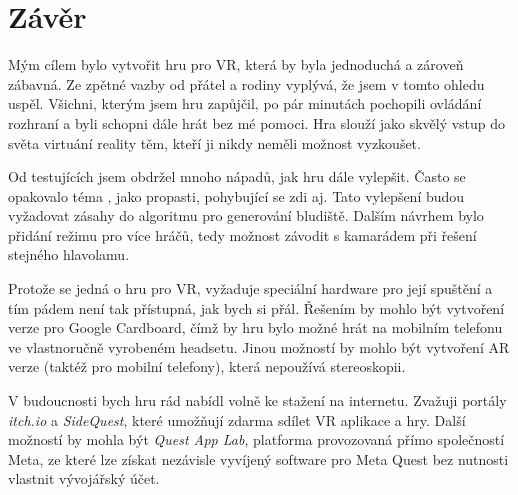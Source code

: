 \chapter*{Závěr}

Mým cílem bylo vytvořit hru pro VR, která by byla jednoduchá a zároveň zábavná. Ze zpětné vazby od přátel a rodiny vyplývá, že jsem v tomto ohledu uspěl. Všichni, kterým jsem hru zapůjčil, po pár minutách pochopili ovládání rozhraní a byli schopni dále hrát bez mé pomoci. Hra slouží jako skvělý vstup do světa virtuání reality těm, kteří ji nikdy neměli možnost vyzkoušet.

Od testujících jsem obdržel mnoho nápadů, jak hru dále vylepšit. Často se opakovalo téma , jako propasti, pohybující se zdi aj. Tato vylepšení budou vyžadovat zásahy do algoritmu pro generování bludiště. Dalším návrhem bylo přidání režimu pro více hráčů, tedy možnost závodit s kamarádem při řešení stejného hlavolamu.

Protože se jedná o hru pro VR, vyžaduje speciální hardware pro její spuštění a tím pádem není tak přístupná, jak bych si přál. Řešením by mohlo být vytvoření verze pro Google Cardboard, čímž by hru bylo možné hrát na mobilním telefonu ve vlastnoručně vyrobeném headsetu. Jinou možností by mohlo být vytvoření AR verze (taktéž pro mobilní telefony), která nepoužívá stereoskopii.

V budoucnosti bych hru rád nabídl volně ke stažení na internetu. Zvažuji portály \textit{itch.io} a \textit{SideQuest}, které umožňují zdarma sdílet VR aplikace a hry. Další možností by mohla být \textit{Quest App Lab}, platforma provozovaná přímo společností Meta, ze které lze získat nezávisle vyvíjený software pro Meta Quest bez nutnosti vlastnit vývojářský účet.
